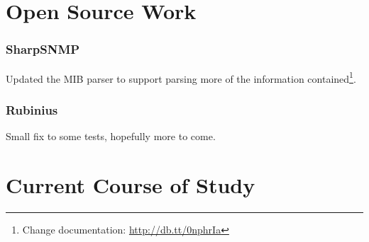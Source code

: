 \documentclass[10pt]{article}
\begin{document}
    \section*{Open Source Work}
        \subsubsection*{SharpSNMP}\small
            Updated the MIB parser to support parsing more of the information contained\footnote{Change documentation: \url{http://db.tt/0nphrIa}}.
        \subsubsection*{Rubinius}\small
            Small fix to some tests, hopefully more to come.

    \section*{Current Course of Study}
    \vspace{-7pt}
\end{document}
